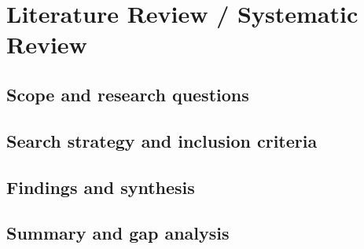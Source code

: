 \chapter{Literature Review / Systematic Review}
\label{chap:literature-review}


\section{Scope and research questions}

\section{Search strategy and inclusion criteria}

\section{Findings and synthesis}

\section{Summary and gap analysis}
